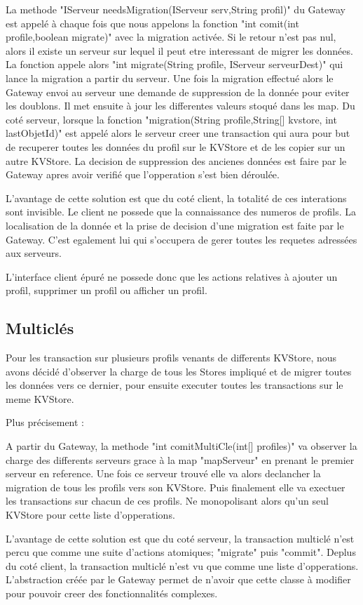 La methode "IServeur needsMigration(IServeur serv,String profil)" du Gateway est appelé à chaque fois que nous appelons la fonction "int comit(int profile,boolean migrate)" avec la migration activée. Si le retour n'est pas nul, alors il existe un serveur sur lequel il peut etre interessant de migrer les données. La fonction appele alors "int migrate(String profile, IServeur serveurDest)" qui lance la migration a partir du serveur.
Une fois la migration effectué alors le Gateway envoi au serveur une demande de suppression de la donnée pour eviter les doublons. Il met ensuite à jour les differentes valeurs stoqué dans les map.
Du coté serveur, lorsque la fonction "migration(String profile,String[] kvstore, int lastObjetId)" est appelé alors le serveur creer une transaction qui aura pour but de recuperer toutes les données du profil sur le KVStore et de les copier sur un autre KVStore. La decision de suppression des ancienes données est faire par le Gateway apres avoir verifié que l'opperation s'est bien déroulée.

L'avantage de cette solution est que du coté client, la totalité de ces interations sont invisible. Le client ne possede que la connaissance des numeros de profils. La localisation de la donnée et la prise de decision d'une migration est faite par le Gateway. C'est egalement lui qui s'occupera de gerer toutes les requetes adressées aux serveurs.

L'interface client épuré ne possede donc que les actions relatives à ajouter un profil, supprimer un profil ou afficher un profil.

\subsection {Multiclés}

Pour les transaction sur plusieurs profils venants de differents KVStore, nous avons décidé d'observer la charge de tous les Stores impliqué et de migrer toutes les données vers ce dernier, pour ensuite executer toutes les transactions sur le meme KVStore.

Plus précisement :

A partir du Gateway, la methode "int comitMultiCle(int[] profiles)" va observer la charge des differents serveurs grace à la map "mapServeur" en prenant le premier serveur en reference. Une fois ce serveur trouvé elle va alors declancher la migration de tous les profils vers son KVStore. Puis finalement elle va exectuer les transactions sur chacun de ces profils. Ne monopolisant alors qu'un seul KVStore pour cette liste d'opperations.

L'avantage de cette solution est que du coté serveur, la transaction multiclé n'est percu que comme une suite d'actions atomiques; "migrate" puis "commit".
Deplus du coté client, la transaction multiclé n'est vu que comme une liste d'opperations. L'abstraction créée par le Gateway permet de n'avoir que cette classe à modifier pour pouvoir creer des fonctionnalités complexes.


